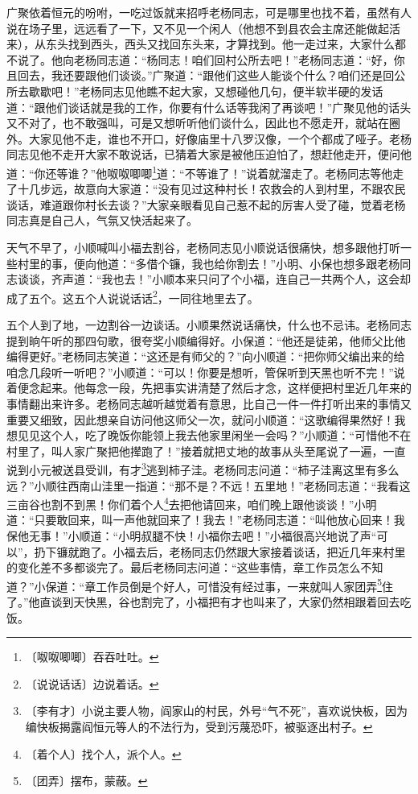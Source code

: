 \documentclass[12pt,UTF-8,openany]{ctexbook}
\begin{document}
\begin{normalsize}
    广聚依着恒元的吩咐，一吃过饭就来招呼老杨同志，可是哪里也找不着，虽然有人说在场子里，远远看了一下，又不见一个闲人（他想不到县农会主席还能做起活来），从东头找到西头，西头又找回东头来，才算找到。他一走过来，大家什么都不说了。他向老杨同志道：“杨同志！咱们回村公所去吧！”老杨同志道：“好，你且回去，我还要跟他们谈谈。”广聚道：“跟他们这些人能谈个什么？咱们还是回公所去歇歇吧！”老杨同志见他瞧不起大家，又想碰他几句，便半软半硬的发话道：“跟他们谈话就是我的工作，你要有什么话等我闲了再谈吧！”广聚见他的话头又不对了，也不敢强叫，可是又想听听他们谈什么，因此也不愿走开，就站在圈外。大家见他不走，谁也不开口，好像庙里十八罗汉像，一个个都成了哑子。老杨同志见他不走开大家不敢说话，已猜着大家是被他压迫怕了，想赶他走开，便问他道：“你还等谁？”他呶呶唧唧\footnote{〔呶呶唧唧〕吞吞吐吐。}道：“不等谁了！”说着就溜走了。老杨同志等他走了十几步远，故意向大家道：“没有见过这种村长！农救会的人到村里，不跟农民谈话，难道跟你村长去谈？”大家亲眼看见自己惹不起的厉害人受了碰，觉着老杨同志真是自己人，气氛又快活起来了。
    
    天气不早了，小顺喊叫小福去割谷，老杨同志见小顺说话很痛快，想多跟他打听一些村里的事，便向他道：“多借个镰，我也给你割去！”小明、小保也想多跟老杨同志谈谈，齐声道：“我也去！”小顺本来只问了个小福，连自己一共两个人，这会却成了五个。这五个人说说话话\footnote{〔说说话话〕边说着话。}，一同往地里去了。
    
    五个人到了地，一边割谷一边谈话。小顺果然说话痛快，什么也不忌讳。老杨同志提到晌午听的那四句歌，很夸奖小顺编得好。小保道：“他还是徒弟，他师父比他编得更好。”老杨同志笑道：“这还是有师父的？”向小顺道：“把你师父编出来的给咱念几段听一听吧？”小顺道：“可以！你要是想听，管保听到天黑也听不完！”说着便念起来。他每念一段，先把事实讲清楚了然后才念，这样便把村里近几年来的事情翻出来许多。老杨同志越听越觉着有意思，比自己一件一件打听出来的事情又重要又细致，因此想亲自访问他这师父一次，就问小顺道：“这歌编得果然好！我想见见这个人，吃了晚饭你能领上我去他家里闲坐一会吗？”小顺道：“可惜他不在村里了，叫人家广聚把他撵跑了！”接着就把丈地的故事从头至尾说了一遍，一直说到小元被送县受训，有才\footnote{〔李有才〕小说主要人物，阎家山的村民，外号“气不死”，喜欢说快板，因为编快板揭露阎恒元等人的不法行为，受到污蔑恐吓，被驱逐出村子。}逃到柿子洼。老杨同志问道：“柿子洼离这里有多么远？”小顺往西南山洼里一指道：“那不是？不远！五里地！”老杨同志道：“我看这三亩谷也割不到黑！你们着个人\footnote{〔着个人〕找个人，派个人。}去把他请回来，咱们晚上跟他谈谈！”小明道：“只要敢回来，叫一声他就回来了！我去！”老杨同志道：“叫他放心回来！我保他无事！”小顺道：“小明叔腿不快！小福你去吧！”小福很高兴地说了声“可以”，扔下镰就跑了。小福去后，老杨同志仍然跟大家接着谈话，把近几年来村里的变化差不多都谈完了。最后老杨同志问道：“这些事情，章工作员怎么不知道？”小保道：“章工作员倒是个好人，可惜没有经过事，一来就叫人家团弄\footnote{〔团弄〕摆布，蒙蔽。}住了。”他直谈到天快黑，谷也割完了，小福把有才也叫来了，大家仍然相跟着回去吃饭。
    

\end{normalsize}
\end{document}

